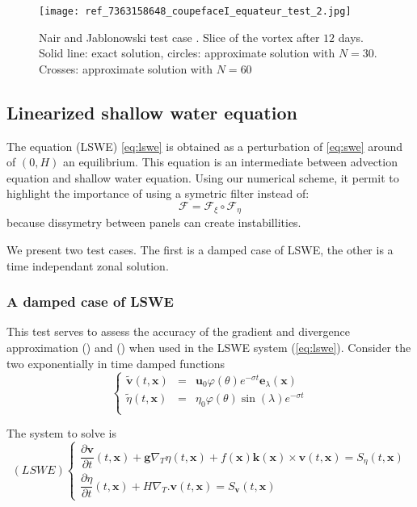 \begin{figure}[ht!]
\texttt{[image: ref\_7363158648\_coupefaceI\_equateur\_test\_2.jpg]}
\caption{Nair and Jablonowski test case \cite{Nair-Jablonowski}. Slice 
of the vortex after $12$ days. Solid line: exact solution, circles:
approximate solution with $N=30$. Crosses: approximate solution with $N=60$}
\label{coupe-NJ-1}
\end{figure}

\subsection{Linearized shallow water equation}

The equation (LSWE) \eqref{eq:lswe} is obtained as a perturbation of  \eqref{eq:swe} around of $(0,H)$ an equilibrium. This equation is an intermediate between advection equation and shallow water equation.
Using our numerical scheme, it permit to highlight the importance of using a symetric filter instead of:
\begin{equation}
\mathcal{F} = \mathcal{F}_{\xi} \circ \mathcal{F}_{\eta}
\end{equation}
because dissymetry between panels can create instabillities.

We present two test cases. The first is a damped case of LSWE, the other is a time independant zonal solution.

\subsubsection{A damped case of LSWE}

This test serves to assess the accuracy of the 
gradient and divergence approximation () and () when
used in the LSWE system (\ref{eq:lswe}). 
Consider the two exponentially in time damped functions
\begin{equation}
\left\lbrace
\begin{array}{rcl}
\tilde{\mathbf{v}} (t,\mathbf{x}) & = & \mathbf{u}_0 \varphi(\theta) e^{-\sigma t}\mathbf{e}_\lambda(\mathbf{x})\\
\tilde{\eta}(t,\mathbf{x}) & = & \eta_0 \varphi(\theta) \sin(\lambda)e^{-\sigma t}\\
\end{array}
\right.
\end{equation}

The system to solve is
\begin{equation}
\label{eq:lswe_damped}
(LSWE) \left\{
\begin{array}{l}
\dfrac{\partial \mathbf{v}}{\partial t} (t,\mathbf{x})+ \mathbf{g} \nabla_T \eta(t,\mathbf{x}) + f(\mathbf{x}) \mathbf{k}(\mathbf{x}) \times
\mathbf{v}(t,\mathbf{x})=S_{\eta}(t,\mathbf{x})\\
\dfrac{\partial \eta}{\partial t}(t,\mathbf{x})+ H \nabla_T . \mathbf{v}(t,\mathbf{x})=S_{\mathbf{v}}(t,\mathbf{x})
\end{array}
\right.
\end{equation}

